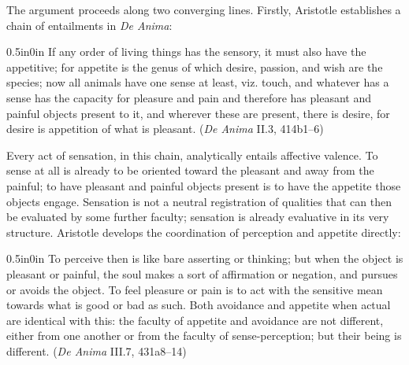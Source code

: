The argument proceeds along two converging lines. Firstly, Aristotle establishes a chain of entailments in \textit{De Anima}:
\begin{adjustwidth}{0.5in}{0in}
If any order of living things has the sensory, it must also have the appetitive; for appetite is the genus of which desire, passion, and wish are the species; now all animals have one sense at least, viz. touch, and whatever has a sense has the capacity for pleasure and pain and therefore has pleasant and painful objects present to it, and wherever these are present, there is desire, for desire is appetition of what is pleasant. (\textit{De Anima} II.3, 414b1--6)
\end{adjustwidth}
Every act of sensation, in this chain, analytically entails affective valence. To sense at all is already to be oriented toward the pleasant and away from the painful; to have pleasant and painful objects present is to have the appetite those objects engage. Sensation is not a neutral registration of qualities that can then be evaluated by some further faculty; sensation is already evaluative in its very structure. Aristotle develops the coordination of perception and appetite directly:
\begin{adjustwidth}{0.5in}{0in}
To perceive then is like bare asserting or thinking; but when the object is pleasant or painful, the soul makes a sort of affirmation or negation, and pursues or avoids the object. To feel pleasure or pain is to act with the sensitive mean towards what is good or bad as such. Both avoidance and appetite when actual are identical with this: the faculty of appetite and avoidance are not different, either from one another or from the faculty of sense-perception; but their being is different. (\textit{De Anima} III.7, 431a8--14)
\end{adjustwidth}
